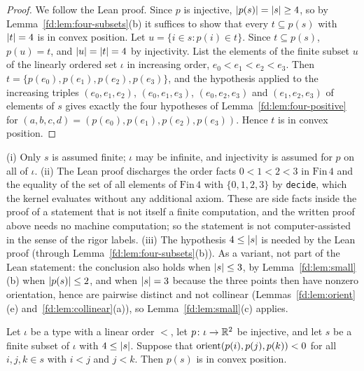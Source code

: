 \begin{proof}
We follow the Lean proof. Since $p$ is injective, $\lvert p(s)\rvert=\lvert s\rvert\ge4$, so by
Lemma~\ref{fd:lem:four-subsets}(b) it suffices to show that every $t\subseteq p(s)$ with $\lvert t\rvert=4$ is in
convex position. Let $u=\{i\in s:p(i)\in t\}$. Since $t\subseteq p(s)$, $p(u)=t$, and $\lvert u\rvert=\lvert t\rvert=4$ by
injectivity. List the elements of the finite subset $u$ of the linearly ordered set $\iota$ in increasing
order, $e_0<e_1<e_2<e_3$. Then $t=\{p(e_0),p(e_1),p(e_2),p(e_3)\}$, and the hypothesis applied to the
increasing triples $(e_0,e_1,e_2)$, $(e_0,e_1,e_3)$, $(e_0,e_2,e_3)$ and $(e_1,e_2,e_3)$ of elements of
$s$ gives exactly the four hypotheses of Lemma~\ref{fd:lem:four-positive} for
$(a,b,c,d)=(p(e_0),p(e_1),p(e_2),p(e_3))$. Hence $t$ is in convex position.
\end{proof}

\begin{remark}\label{fd:rem:pos-triples}
(i) Only $s$ is assumed finite; $\iota$ may be infinite, and injectivity is assumed for $p$ on all of
$\iota$. (ii) The Lean proof discharges the order facts $0<1<2<3$ in $\mathrm{Fin}\,4$ and the equality
of the set of all elements of $\mathrm{Fin}\,4$ with $\{0,1,2,3\}$ by \texttt{decide}, which the kernel
evaluates without any additional axiom. These are side facts inside the proof of a statement that is not
itself a finite computation, and the written proof above needs no machine computation; so the statement
is not computer-assisted in the sense of the rigor labels. (iii) The
hypothesis $4\le\lvert s\rvert$ is needed by the Lean proof (through Lemma~\ref{fd:lem:four-subsets}(b)). As a
variant, not part of the Lean statement: the conclusion also holds when $\lvert s\rvert\le3$, by
Lemma~\ref{fd:lem:small}(b) when $\lvert p(s)\rvert\le2$, and when $\lvert s\rvert=3$ because the three points then
have nonzero orientation, hence are pairwise distinct and not collinear
(Lemmas~\ref{fd:lem:orient}(e) and~\ref{fd:lem:collinear}(a)), so Lemma~\ref{fd:lem:small}(c) applies.
\end{remark}

\begin{lemma}\label{fd:lem:neg-triples}\sloppy
Let $\iota$ be a type with a linear order $<$, let $p\colon\iota\to\mathbb R^2$ be injective, and let $s$ be a
finite subset of $\iota$ with $4\le\lvert s\rvert$. Suppose that $\operatorname{orient}(p(i),p(j),p(k))<0$ for all
$i,j,k\in s$ with $i<j$ and $j<k$. Then $p(s)$ is in convex position.
\end{lemma}

